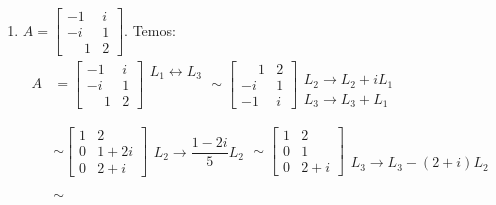 \begin{exemplo}
\begin{enumerate}[label={\arabic*})]
		\item $A = \begin{bmatrix}
		-1 & i\\
		-i & 1\\
		\phantom{-}1 & 2
		\end{bmatrix}.$ Temos:
		\begin{align*}
			A &=
				\left[
					\begin{array}{cc}
						-1 & i\\
						-i & 1\\
						\phantom{-}1 & 2
					\end{array}
				\right]
				\begin{array}{l}
					L_1 \leftrightarrow L_3\\
					\phantom{x}\\
					\phantom{x}
				\end{array} \sim
				\left[
					\begin{array}{cc}
						\phantom{-}1 & 2\\
						-i & 1\\
						-1 & i
					\end{array}
				\right]
				\begin{array}{l}
					\phantom{x}\\
					L_2 \to L_2 + iL_1\\
					L_3 \to L_3 + L_1
				\end{array}\\ \\ &\sim
				\left[
					\begin{array}{cc}
						1 & 2\\
						0 & 1 + 2i\\
						0 & 2 + i
					\end{array}
				\right]
				\begin{array}{l}
					\phantom{x}\\
					L_2 \to \dfrac{1 - 2i}{5}L_2\\
					\phantom{x}
				\end{array} \sim
				\left[
					\begin{array}{cc}
						1 & 2\\
						0 & 1\\
						0 & 2 + i
					\end{array}
				\right]
				\begin{array}{l}
					\phantom{x}\\
					\phantom{x}\\
					L_3 \to L_3 - (2 + i)L_2
				\end{array}\\ \\ &\sim

\end{align*}
\end{enumerate}
\end{exemplo}
